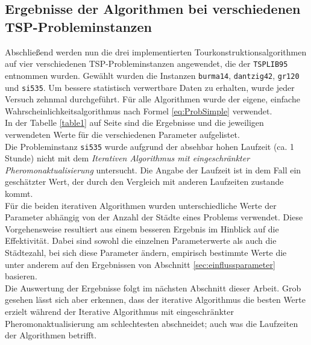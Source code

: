 \documentclass[doktyp=barbeit, sprache=german]{TUBAFarbeiten}
\begin{document}
\subsection{Ergebnisse der Algorithmen bei verschiedenen TSP-Probleminstanzen}
Abschließend werden nun die drei implementierten Tourkonstruktionsalgorithmen auf vier verschiedenen TSP-Probleminstanzen angewendet, die der \texttt{TSPLIB95} entnommen wurden. Gewählt wurden die Instanzen \texttt{burma14}, \texttt{dantzig42}, \texttt{gr120} und \texttt{si535}. Um bessere statistisch verwertbare Daten zu erhalten, wurde jeder Versuch zehnmal durchgeführt. Für alle Algorithmen wurde der eigene, einfache Wahrscheinlichkeitsalgorithmus nach Formel \ref{eq:ProbSimple} verwendet.
\\In der Tabelle \ref{table1} auf Seite \pageref{table1} sind die Ergebnisse und die jeweiligen verwendeten Werte für die verschiedenen Parameter aufgelistet.
\\Die Probleminstanz \texttt{si535} wurde aufgrund der absehbar hohen Laufzeit (ca. 1 Stunde) nicht mit dem \textit{Iterativen Algorithmus mit eingeschränkter Pheromonaktualisierung} untersucht. Die Angabe der Laufzeit ist in dem Fall ein geschätzter Wert, der durch den Vergleich mit anderen Laufzeiten zustande kommt.
\\Für die beiden iterativen Algorithmen wurden unterschiedliche Werte der Parameter abhängig von der Anzahl der Städte eines Problems verwendet. Diese Vorgehensweise resultiert aus einem besseren Ergebnis im Hinblick auf die Effektivität. Dabei sind sowohl die einzelnen Parameterwerte als auch die Städtezahl, bei sich diese Parameter ändern, empirisch bestimmte Werte die unter anderem auf den Ergebnissen von Abschnitt \ref{sec:einflussparameter} basieren.
\\Die Auswertung der Ergebnisse folgt im nächsten Abschnitt dieser Arbeit. Grob gesehen lässt sich aber erkennen, dass der iterative Algorithmus die besten Werte erzielt während der Iterative Algorithmus mit eingeschränkter Pheromonaktualisierung am schlechtesten abschneidet; auch was die Laufzeiten der Algorithmen betrifft.
\newpage
\end{document}
